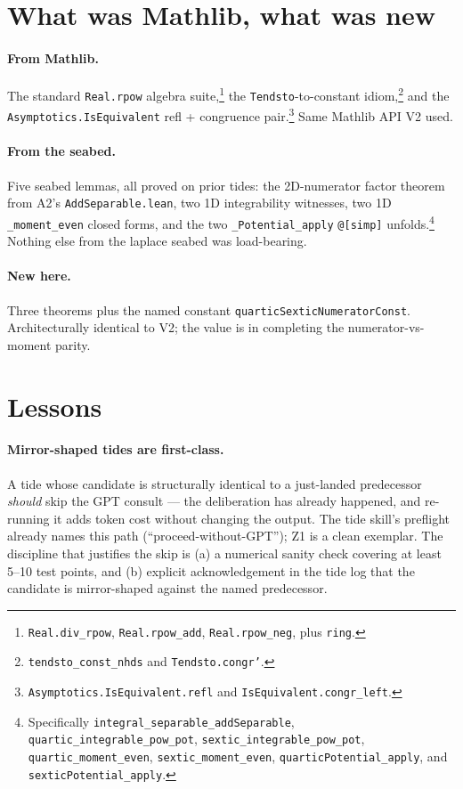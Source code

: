 \documentclass[11pt]{article}
\begin{document}
\section{What was Mathlib, what was new}

\paragraph{From Mathlib.} The standard \texttt{Real.rpow} algebra
suite,\footnote{\texttt{Real.div\_rpow}, \texttt{Real.rpow\_add},
\texttt{Real.rpow\_neg}, plus \texttt{ring}.} the
\texttt{Tendsto}-to-constant idiom,\footnote{\texttt{tendsto\_const\_nhds}
and \texttt{Tendsto.congr'}.} and the
\texttt{Asymptotics.IsEquivalent} refl + congruence
pair.\footnote{\texttt{Asymptotics.IsEquivalent.refl} and
\texttt{IsEquivalent.congr\_left}.} Same Mathlib API V2 used.

\paragraph{From the seabed.} Five seabed lemmas, all proved on prior
tides: the 2D-numerator factor theorem from A2's
\texttt{AddSeparable.lean}, two 1D integrability witnesses, two 1D
\texttt{\_moment\_even} closed forms, and the two
\texttt{\_Potential\_apply} \texttt{@[simp]}
unfolds.\footnote{Specifically
\texttt{integral\_separable\_addSeparable},
\texttt{quartic\_integrable\_pow\_pot},
\texttt{sextic\_integrable\_pow\_pot},
\texttt{quartic\_moment\_even}, \texttt{sextic\_moment\_even},
\texttt{quarticPotential\_apply}, and
\texttt{sexticPotential\_apply}.} Nothing else from the laplace
seabed was load-bearing.

\paragraph{New here.} Three theorems plus the named constant
\texttt{quarticSexticNumeratorConst}. Architecturally identical to
V2; the value is in completing the numerator-vs-moment parity.

\section{Lessons}

\paragraph{Mirror-shaped tides are first-class.} A tide whose
candidate is structurally identical to a just-landed predecessor
\emph{should} skip the GPT consult --- the deliberation has already
happened, and re-running it adds token cost without changing the
output. The tide skill's preflight already names this path
(``proceed-without-GPT''); Z1 is a clean exemplar. The discipline
that justifies the skip is (a) a numerical sanity check covering at
least 5--10 test points, and (b) explicit acknowledgement in the
tide log that the candidate is mirror-shaped against the named
predecessor.
\end{document}
